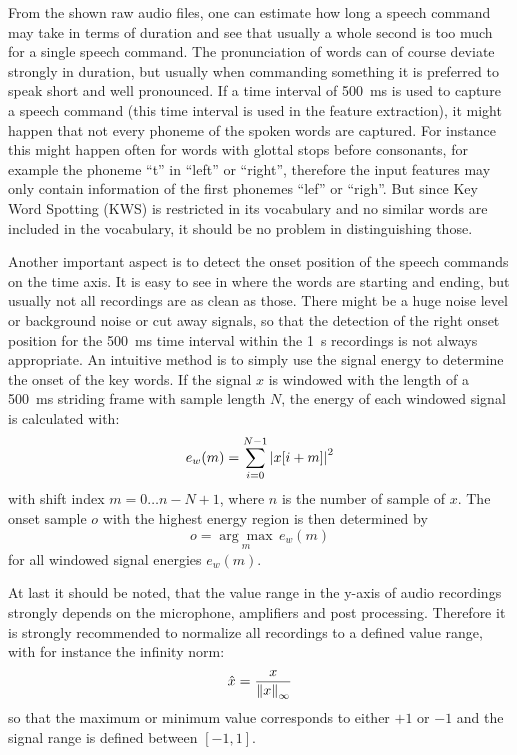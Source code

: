 From the shown raw audio files, one can estimate how long a speech command may take in terms of duration and see that usually a whole second is too much for a single speech command.
The pronunciation of words can of course deviate strongly in duration, but usually when commanding something it is preferred to speak short and well pronounced.
If a time interval of \SI{500}{\milli\second} is used to capture a speech command (this time interval is used in the feature extraction), it might happen that not every phoneme of the spoken words are captured. 
For instance this might happen often for words with glottal stops before consonants, for example the phoneme \enquote{t} in \enquote{left} or \enquote{right}, therefore the input features may only contain information of the first phonemes \enquote{lef} or \enquote{righ}.
But since Key Word Spotting (KWS) is restricted in its vocabulary and no similar words are included in the vocabulary, it should be no problem in distinguishing those.

Another important aspect is to detect the onset position of the speech commands on the time axis. 
It is easy to see in  where the words are starting and ending, but usually not all recordings are as clean as those.
There might be a huge noise level or background noise or cut away signals, so that the detection of the right onset position for the \SI{500}{\milli\second} time interval within the \SI{1}{\second} recordings is not always appropriate.
An intuitive method is to simply use the signal energy to determine the onset of the key words.
If the signal $x$ is windowed with the length of a \SI{500}{\milli\second} striding frame with sample length $N$, the energy of each windowed signal is calculated with:
\begin{equation}
  e_{w}(m) = \sum_{i=0}^{N-1} \abs{x[i + m]}^2
\end{equation}
with shift index $m = 0 \dots n - N + 1$, where $n$ is the number of sample of $x$.
The onset sample $o$ with the highest energy region is then determined by
\begin{equation}
  o = \underset{m}{\arg \max} \, e_{w}(m)
\end{equation}
for all windowed signal energies $e_{w}(m)$.

At last it should be noted, that the value range in the y-axis of audio recordings strongly depends on the microphone, amplifiers and post processing.
Therefore it is strongly recommended to normalize all recordings to a defined value range, with for instance the infinity norm:
\begin{equation}
  \hat{x} = \frac{x}{\norm{x}_\infty}
\end{equation}
so that the maximum or minimum value corresponds to either $+1$ or $-1$ and the signal range is defined between $[-1, 1]$.